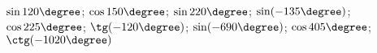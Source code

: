 \begin{ex}[type=calculate]
	\begin{condition}
		\( \sin120\degree \); \( \cos150\degree \); \( \sin220\degree \); \( \sin(-135\degree) \); \( \cos225\degree \); \( \tg(-120\degree) \); \( \sin(-690\degree) \); \( \cos405\degree \); \( \ctg(-1020\degree )\)
	\end{condition}
\end{ex}